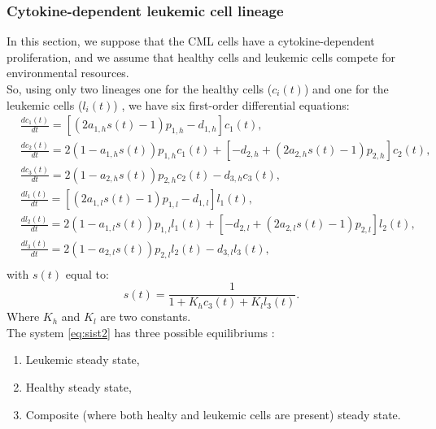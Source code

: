 \documentclass[a4paper,10pt]{article}
\begin{document}
\FloatBarrier

\subsubsection{ Cytokine-dependent leukemic cell lineage}
In this section,
we suppose that 
the CML cells have a cytokine-dependent proliferation,
and we assume that healthy cells and leukemic cells compete for environmental
resources.\\
So, using only two lineages 
one for the healthy cells ($c_{i}(t)$) and one for 
the leukemic cells ($l_{i}(t)$) ,
we have six first-order differential equations:
\begin{equation}
\begin{array}{ll}
& \frac{dc_{1}(t)}{dt}= [(2a_{1,h}s(t)-1)p_{1,h}-d_{1,h}]c_{1}(t),\\
& \frac{dc_{2}(t)}{dt}=2(1-a_{1,h}s(t))p_{1,h}c_{1}(t) +[-d_{2,h}+(2a_{2,h}s(t)-1)p_{2,h}]c_{2}(t), \\
& \frac{dc_{3}(t)}{dt}=2(1-a_{2,h}s(t))p_{2,h}c_{2}(t)-d_{3,h}c_{3}(t), \\
& \frac{dl_{1}(t)}{dt}= [(2a_{1,l}s(t)-1)p_{1,l}-d_{1,l}]l_{1}(t), \\
& \frac{dl_{2}(t)}{dt}=2(1-a_{1,l}s(t))p_{1,l}l_{1}(t) +[-d_{2,l}+(2a_{2,l}s(t)-1)p_{2,l}]l_{2}(t), \\
& \frac{dl_{3}(t)}{dt}=2(1-a_{2,l}s(t))p_{2,l}l_{2}(t)-d_{3,l}l_{3}(t), \\
\end{array}
\label{eq:sist2}
\end{equation}
with $s(t)$ equal to:
\begin{equation}
s(t)=\frac{1}{1+K_hc_{3}(t)+K_ll_{3}(t)}.
\end{equation}
Where $K_h$ and $K_l$ are two constants.\\
The system \eqref{eq:sist2}
has three possible equilibriums \cite{stiehl2012mathematical}:
\begin{enumerate}
\item Leukemic steady state,
\item Healthy steady state,
\item Composite (where both healty and leukemic cells are present) steady state.
\end{enumerate}
\end{document}
